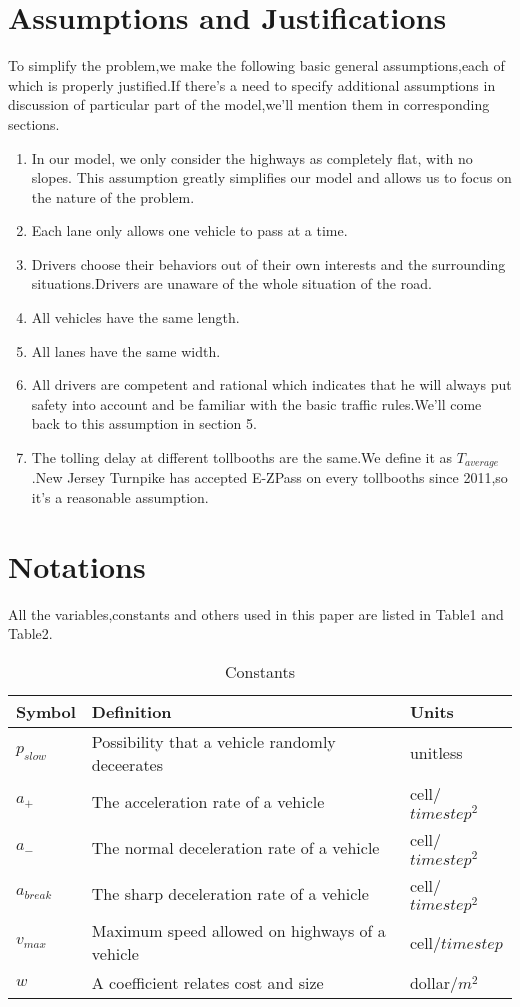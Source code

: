 \section{Assumptions and Justifications}
To simplify the problem,we make the following basic general assumptions,each of which is properly justified.If there's a need to specify additional assumptions in discussion of particular part of the model,we'll mention them in corresponding sections.
\begin{enumerate}[(1)]
\item
In our model, we only consider the highways as completely flat, with no slopes. This assumption greatly simplifies our model and allows us to focus on the nature of the problem. 
\item
Each lane only allows one vehicle to pass at a time.
\item
Drivers choose their behaviors out of their own interests and the surrounding situations.Drivers are unaware of the whole situation of the road.
\item
All vehicles have the same length.
\item
All lanes have the same width.
\item
All drivers are competent and rational which indicates that he will always put safety into account and be familiar with the basic traffic rules.We'll come back to this assumption in section 5.
\item
The tolling delay at different tollbooths are the same.We define it as $T_{average}$.New Jersey Turnpike has accepted E-ZPass on every tollbooths since 2011,so it's a reasonable assumption.
\end{enumerate}




\section{Notations}
All the variables,constants and others used in this paper are listed in Table1 and Table2.
\begin{table}[h]
\centering
\begin{tabular}{|l|l|l|}
\hline
Symbol &Definition & Units\\
\hline
$p_{slow}$&Possibility that a vehicle randomly deceerates&unitless\\
\hline
$a_+$&The acceleration rate of a vehicle&cell/$timestep^2$\\
\hline
$a_-$&The normal deceleration rate of a vehicle&cell/$timestep^2$\\
\hline
$a_{break}$&The sharp deceleration rate of a vehicle&cell/$timestep^2$\\
\hline
$v_{max}$&Maximum speed allowed on highways of a vehicle&cell/$timestep$\\
\hline
$w$&A coefficient relates cost and size&dollar/$m^2$\\
\hline
\end{tabular}
\caption{Constants}
\end{table}

